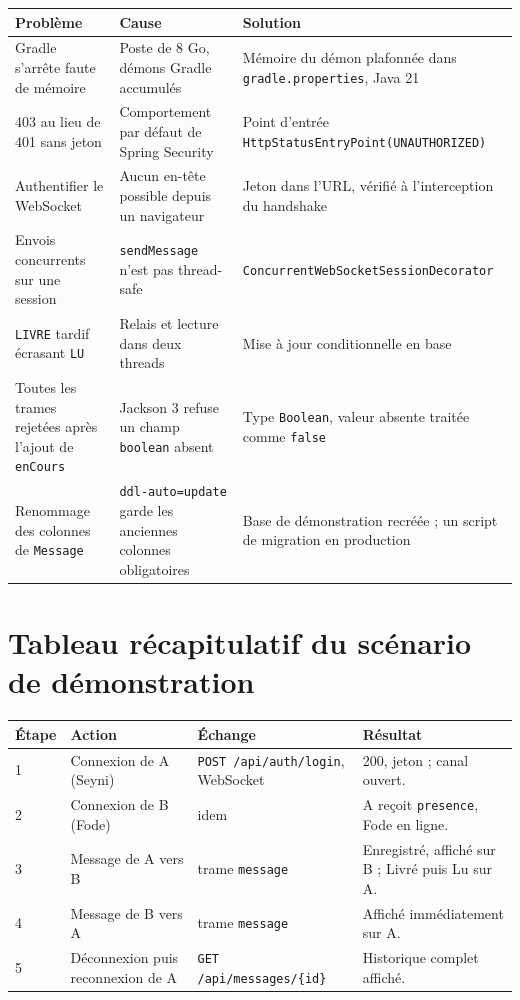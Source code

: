 \documentclass[11pt,a4paper]{article}
\begin{document}
{\small\renewcommand{\arraystretch}{1.35}
\begin{longtable}{@{}L{4.4cm}L{5.2cm}L{5.6cm}@{}}
\toprule
\textbf{Problème} & \textbf{Cause} & \textbf{Solution} \\
\midrule
Gradle s'arrête faute de mémoire & Poste de 8 Go, démons Gradle accumulés & Mémoire du démon plafonnée dans \texttt{gradle.properties}, Java 21 \\
403 au lieu de 401 sans jeton & Comportement par défaut de Spring Security & Point d'entrée \texttt{HttpStatusEntryPoint}\allowbreak\texttt{(UNAUTHORIZED)} \\
Authentifier le WebSocket & Aucun en-tête possible depuis un navigateur & Jeton dans l'URL, vérifié à l'interception du handshake \\
Envois concurrents sur une session & \texttt{sendMessage} n'est pas thread-safe & \texttt{ConcurrentWebSocket}\allowbreak\texttt{SessionDecorator} \\
\texttt{LIVRE} tardif écrasant \texttt{LU} & Relais et lecture dans deux threads & Mise à jour conditionnelle en base \\
Toutes les trames rejetées après l'ajout de \texttt{enCours} & Jackson 3 refuse un champ \texttt{boolean} absent & Type \texttt{Boolean}, valeur absente traitée comme \texttt{false} \\
Renommage des colonnes de \texttt{Message} & \texttt{ddl-auto=update} garde les anciennes colonnes obligatoires & Base de démonstration recréée ; un script de migration en production \\
\bottomrule
\end{longtable}}

\FloatBarrier
{}
\section{Tableau récapitulatif du scénario de démonstration}

{\small\renewcommand{\arraystretch}{1.4}
\begin{tabular}{@{}L{1.2cm}L{4.1cm}L{4.4cm}L{5.5cm}@{}}
\toprule
\textbf{Étape} & \textbf{Action} & \textbf{Échange} & \textbf{Résultat} \\
 & Connexion de A (Seyni) & \texttt{POST /api/auth/login}, WebSocket & 200, jeton ; canal ouvert. \\
2 & Connexion de B (Fode) & idem & A reçoit \texttt{presence}, Fode en ligne. \\
3 & Message de A vers B & trame \texttt{message} & Enregistré, affiché sur B ; Livré puis Lu sur A. \\
4 & Message de B vers A & trame \texttt{message} & Affiché immédiatement sur A. \\
5 & Déconnexion puis reconnexion de A & \texttt{GET /api/messages/\{id\}} & Historique complet affiché. \\
\bottomrule
\end{tabular}}
\end{document}
